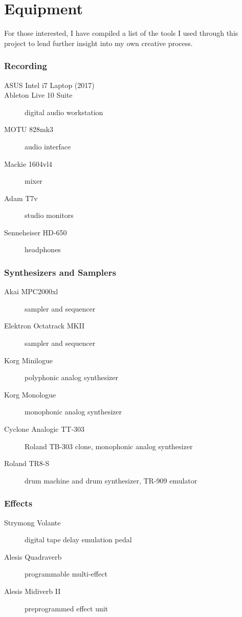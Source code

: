 \documentclass[12pt,twoside]{reedthesis}
\begin{document}
\appendix

\chapter{Equipment}

For those interested, I have compiled a list of the tools I used through this project to lend further insight into my own creative process.
\subsection{Recording}
\begin{description}
	\item [ASUS Intel i7 Laptop (2017)]
	\item [Ableton Live 10 Suite] digital audio workstation
	\item [MOTU 828mk3] audio interface
	\item [Mackie 1604vl4] mixer
	\item [Adam T7v] studio monitors
	\item [Senneheiser HD-650] headphones
\end{description}
\subsection{Synthesizers and Samplers}
\begin{description}
	\item [Akai MPC2000xl] sampler and sequencer
	\item [Elektron Octatrack MKII] sampler and sequencer
	\item[Korg Minilogue] polyphonic analog synthesizer
	\item[Korg Monologue] monophonic analog synthesizer
	\item[Cyclone Analogic TT-303] Roland TB-303 clone, monophonic analog synthesizer
	\item[Roland TR8-S] drum machine and drum synthesizer, TR-909 emulator
\end{description}
\subsection{Effects}
\begin{description}
	\item[Strymong Volante] digital tape delay emulation pedal
	\item[Alesis Quadraverb] programmable multi-effect
	\item[Alesis Midiverb II] preprogrammed effect unit
\end{description}
\end{document}
